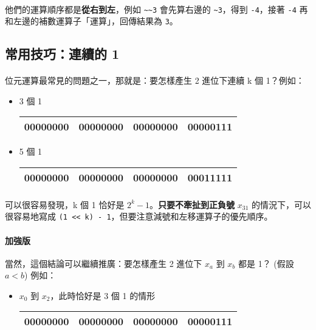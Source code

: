 \documentclass[12pt,a4paper,oneside]{report}
\begin{document}
\begin{CJK}{UTF8}{bkai}
\paragraph{}他們的運算順序都是\textbf{從右到左}，例如 \lstinline!~~3! 會先算右邊的 \lstinline!~3!，得到 \lstinline!-4!，接著 \lstinline!-4! 再和左邊的補數運算子「運算」，回傳結果為 \lstinline!3!。

\subsection{常用技巧：連續的 1}

\paragraph{}位元運算最常見的問題之一，那就是：要怎樣產生 2 進位下連續 k 個 1？例如：
\begin{itemize}
\item 3 個 1
\begin{table}[h!]
\centering
\begin{tabular}{|c|c|c|c|}
\hline
00000000 & 00000000 & 00000000 & 00000\textbf{111}\\
\hline
\end{tabular}
\end{table}

\item 5 個 1
\begin{table}[h!]
\centering
\begin{tabular}{|c|c|c|c|}
\hline
00000000 & 00000000 & 00000000 & 000\textbf{11111}\\
\hline
\end{tabular}
\end{table}
\end{itemize}

\paragraph{}可以很容易發現，k 個 1 恰好是 $2^k-1$。\textbf{只要不牽扯到正負號} $x_{31}$ 的情況下，可以很容易地寫成 \lstinline!(1 << k) - 1!，但要注意減號和左移運算子的優先順序。
\paragraph{加強版}當然，這個結論可以繼續推廣：要怎樣產生 2 進位下 $x_a$ 到 $x_b$ 都是 1？ (假設 $a<b$) 例如：

\begin{itemize}
\item $x_0$ 到 $x_2$，此時恰好是 3 個 1 的情形
\begin{table}[h!]
\centering
\begin{tabular}{|c|c|c|c|}
\hline
00000000 & 00000000 & 00000000 & 00000\textbf{111}\\
\hline
\end{tabular}
\end{table}


\end{itemize}
\end{CJK}
\end{document}
